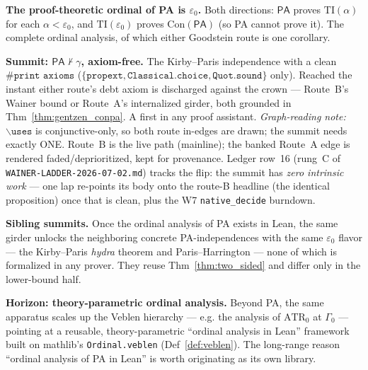 \begin{theorem}\label{thm:two_sided}
  \notready
\textbf{The proof-theoretic ordinal of PA is \(\varepsilon_0\).}  Both directions:
\(\mathsf{PA}\) proves \(\mathrm{TI}(\alpha)\) for each \(\alpha<\varepsilon_0\), and
\(\mathrm{TI}(\varepsilon_0)\) proves \(\mathrm{Con}(\mathsf{PA})\) (so PA cannot prove it).  The complete
ordinal analysis, of which either Goodstein route is one corollary.
\end{theorem}

\begin{theorem}\label{thm:pa_not_proves_goodstein}
  \notready
\textbf{Summit: \(\mathsf{PA}\nvdash\gamma\), axiom-free.}  The Kirby--Paris independence with a clean
\(\texttt{\#print axioms}\) (\(\{\texttt{propext},\texttt{Classical.choice},\texttt{Quot.sound}\}\)
only).  Reached the instant either route's debt axiom is discharged against the crown --- Route~B's
Wainer bound or Route~A's internalized girder, both grounded in Thm~\ref{thm:gentzen_conpa}.  A first in any
proof assistant.  \emph{Graph-reading note:} \(\backslash\texttt{uses}\) is conjunctive-only, so both
route in-edges are drawn; the summit needs exactly ONE.  Route~B is the live path (mainline); the
banked Route~A edge is rendered faded/deprioritized, kept for provenance.
Ledger row~16 (rung~C of \texttt{WAINER-LADDER-2026-07-02.md}) tracks the flip: the summit has
\emph{zero intrinsic work} --- one lap re-points its body onto the route-B headline (the identical
proposition) once that is clean, plus the W7 \texttt{native\_decide} burndown.
\end{theorem}

\begin{theorem}\label{thm:siblings}
  \notready
\textbf{Sibling summits.}  Once the ordinal analysis of PA exists in Lean, the same girder unlocks the
neighboring concrete PA-independences with the same \(\varepsilon_0\) flavor --- the Kirby--Paris
\emph{hydra} theorem and Paris--Harrington --- none of which is formalized in any prover.  They reuse
Thm~\ref{thm:two_sided} and differ only in the lower-bound half.
\end{theorem}

\begin{theorem}\label{thm:horizon}
  \notready
\textbf{Horizon: theory-parametric ordinal analysis.}  Beyond PA, the same apparatus scales up the
Veblen hierarchy --- e.g. the analysis of \(\mathrm{ATR}_0\) at \(\Gamma_0\) --- pointing at a reusable,
theory-parametric ``ordinal analysis in Lean'' framework built on mathlib's \texttt{Ordinal.veblen}
(Def~\ref{def:veblen}).  The long-range reason ``ordinal analysis of PA in Lean'' is worth originating
as its own library.
\end{theorem}
